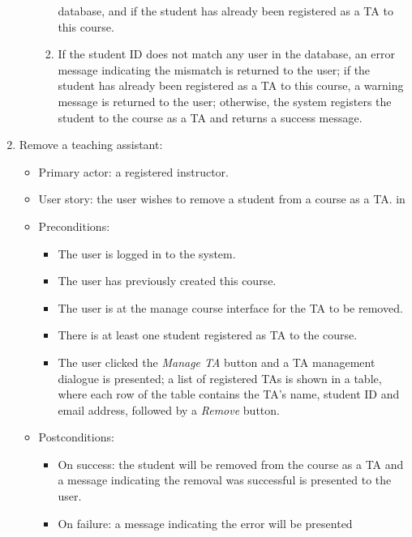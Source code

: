 \begin{enumerate}
\begin{itemize}
\begin{enumerate}
                database, and if the student has already been registered as a
                TA to this course.
            \item If the student ID does not match any user in the database, 
                an error message indicating the mismatch is returned to the
                user;
                if the student has already been registered as a TA to this
                course, a warning message is returned to the user; otherwise,
                the system registers the student to the course as a TA and
                returns a success message.
        \end{enumerate}
\end{itemize}

\item Remove a teaching assistant:
\begin{itemize}
    \item Primary actor: a registered instructor.
    \item User story: the user wishes to remove a student from a course as a
        TA.
         in
    \item Preconditions:
        \begin{itemize}
            \item The user is logged in to the system.
            \item The user has previously created this course.
            \item The user is at the manage course interface for the TA
                to be removed.
            \item There is at least one student registered as TA to the course.
            \item The user clicked the \emph{Manage TA} button and a TA
                management dialogue is presented; a list of registered TAs
                is shown in a table, where each row of the table contains the TA's
                name, student ID and email address, followed by a \emph{Remove}
                button.
        \end{itemize}
    \item Postconditions:
        \begin{itemize}
            \item On success: the student will be removed from the course
                as a TA and a message indicating the removal was
                successful is presented to the user.
            \item On failure: a message indicating the error will be presented

\end{itemize}
\end{itemize}
\end{enumerate}

